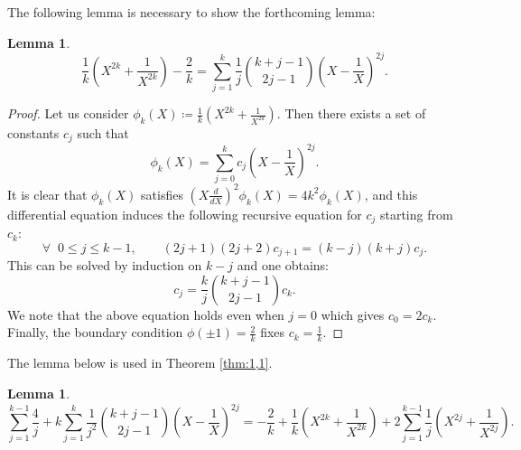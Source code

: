 \documentclass[12pt]{amsart}
\theoremstyle{plain}
\newtheorem{lemma}[theorem]{Lemma}
\theoremstyle{definition}
\theoremstyle{remark}
\numberwithin{equation}{section}
\begin{document}
The following lemma is necessary to show the forthcoming lemma:
\begin{lemma}\label{lem:combinatorics1}
    \begin{equation}
        \frac{1}{k}\left(X^{2k}+\frac{1}{X^{2k}}\right)-\frac{2}{k}=\sum_{j=1}^k\frac{1}{j}\binom{k+j-1}{2j-1}\left(X-\frac{1}{X}\right)^{2j}.
    \end{equation}
\end{lemma}
\begin{proof}
    Let us consider $\phi_k(X)\coloneqq\frac{1}{k}\left(X^{2k}+\frac{1}{X^{2k}}\right)$. Then there exists a set of constants $c_j$ such that
    \begin{equation*}
        \phi_k(X)=\sum_{j=0}^kc_j\left(X-\frac{1}{X}\right)^{2j}.
    \end{equation*}
    It is clear that $\phi_k(X)$ satisfies $\left(X\frac{d}{dX}\right)^2\phi_k(X)=4k^2\phi_k(X)$, and this differential equation induces the following recursive equation for $c_j$ starting from $c_k$:
    \begin{equation*}
      \forall\;\; 0\leq j\leq k-1,\qquad  (2j+1)(2j+2)c_{j+1}=(k-j)(k+j)c_j.
    \end{equation*}
    This can be solved by induction on $k-j$ and one obtains:
    \begin{equation*}
        c_j=\frac{k}{j}\binom{k+j-1}{2j-1}c_k.
    \end{equation*}
    We note that the above equation holds even when $j=0$ which gives $c_0=2c_k$. Finally, the boundary condition $\phi(\pm1)=\frac{2}{k}$ fixes $c_k=\frac{1}{k}$.
\end{proof}
The lemma below is used in Theorem \ref{thm:1,1}.
\begin{lemma}\label{lem:combinatorics2}
    \begin{equation*}
         \sum_{j=1}^{k-1}\frac{4}{j}+k\sum_{j=1}^k\frac{1}{j^2}\binom{k+j-1}{2j-1}\left(X-\frac{1}{X}\right)^{2j}=-\frac{2}{k}+\frac{1}{k}\left(X^{2k}+\frac{1}{X^{2k}}\right)+2\sum_{j=1}^{k-1}\frac{1}{j}\left(X^{2j}+\frac{1}{X^{2j}}\right).
    \end{equation*}
\end{lemma}
\end{document}
